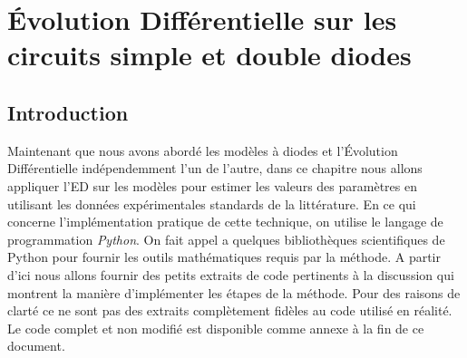 \chapter{Évolution Différentielle sur les circuits simple et double diodes}

\section{Introduction}
Maintenant que nous avons abordé les modèles à diodes et l'Évolution Différentielle indépendemment l'un de l'autre, dans ce chapitre nous allons appliquer l'ED  sur les modèles pour estimer les valeurs des paramètres en utilisant les données expérimentales standards de la littérature. En ce qui concerne l'implémentation pratique de cette technique, on utilise le langage de programmation \textit{Python}. On fait appel a quelques bibliothèques scientifiques de Python pour fournir les outils mathématiques requis par la méthode. A partir d'ici nous allons fournir des petits extraits de code pertinents à la discussion qui montrent la manière d'implémenter les étapes de la méthode. Pour des raisons de clarté ce ne sont pas des extraits complètement fidèles au code utilisé en réalité. Le code complet et non modifié est disponible comme annexe à la fin de ce document. 

